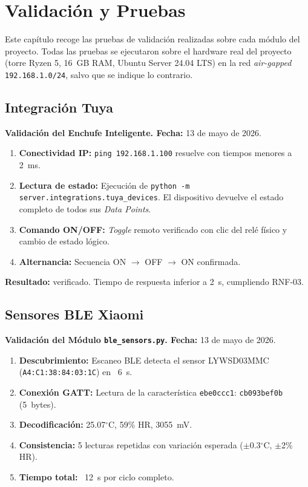 \chapter{Validación y Pruebas}\label{cap:validacion}


Este capítulo recoge las pruebas de validación realizadas sobre cada módulo del proyecto. Todas las pruebas se ejecutaron sobre el hardware real del proyecto (torre Ryzen 5, 16~GB RAM, Ubuntu Server 24.04 LTS) en la red \textit{air-gapped} \texttt{192.168.1.0/24}, salvo que se indique lo contrario.

\section{Integración Tuya}
\label{sec:pruebas_tuya}

\textbf{Validación del Enchufe Inteligente. Fecha:} 13 de mayo de 2026.

\begin{enumerate}
    \item \textbf{Conectividad IP:} \texttt{ping 192.168.1.100} resuelve con tiempos menores a 2~ms.
    \item \textbf{Lectura de estado:} Ejecución de \texttt{python -m server.integrations.tuya\_devices}. El dispositivo devuelve el estado completo de todos sus \textit{Data Points}.
    \item \textbf{Comando ON/OFF:} \textit{Toggle} remoto verificado con clic del relé físico y cambio de estado lógico.
    \item \textbf{Alternancia:} Secuencia ON $\rightarrow$ OFF $\rightarrow$ ON confirmada.
\end{enumerate}

\textbf{Resultado:} verificado. Tiempo de respuesta inferior a 2~s, cumpliendo RNF-03.

\section{Sensores BLE Xiaomi}
\label{sec:pruebas_ble}

\textbf{Validación del Módulo \texttt{ble\_sensors.py}. Fecha:} 13 de mayo de 2026.

\begin{enumerate}
    \item \textbf{Descubrimiento:} Escaneo BLE detecta el sensor LYWSD03MMC (\texttt{A4:C1:38:84:03:1C}) en ~6~s.
    \item \textbf{Conexión GATT:} Lectura de la característica \texttt{ebe0ccc1}: \texttt{cb093bef0b} (5~bytes).
    \item \textbf{Decodificación:} 25.07$^\circ$C, 59\% HR, 3055~mV.
    \item \textbf{Consistencia:} 5 lecturas repetidas con variación esperada ($\pm$0.3$^\circ$C, $\pm$2\% HR).
    \item \textbf{Tiempo total:} ~12~s por ciclo completo.
\end{enumerate}

